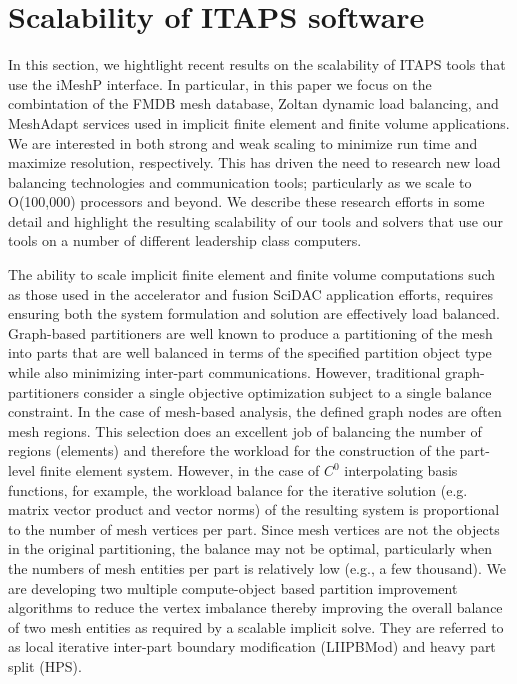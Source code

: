 \documentclass[letterpaper]{jpconf}
\begin{document}
\section{Scalability of ITAPS software}
\label{sec:petascale}

In this section, we hightlight recent results on the scalability of
ITAPS tools that use the iMeshP interface.  In particular, in this
paper we focus on the combintation of the FMDB mesh database, 
Zoltan dynamic load balancing, and MeshAdapt services used in implicit
finite element and finite volume applications.  We are interested in
both strong and weak scaling to minimize run time and maximize
resolution, respectively. This has driven the need to research new
load balancing technologies and communication tools; particularly as we
scale to O(100,000) processors and beyond.  We describe these research
efforts in some detail and highlight the resulting scalability of our
tools and solvers that use our tools on a number of different
leadership class computers.

The ability to scale implicit finite element and finite volume
computations such as those used in the accelerator and fusion SciDAC
application efforts, requires ensuring both the system formulation and
solution are effectively load balanced. Graph-based partitioners are
well known to produce a partitioning of the mesh into parts that are
well balanced in terms of the specified partition object type while
also minimizing inter-part communications. However, traditional
graph-partitioners consider a single objective optimization subject to
a single balance constraint. In the case of mesh-based analysis, the
defined graph nodes are often mesh regions. This selection does an
excellent job of balancing the number of regions (elements) and
therefore the workload for the construction of the part-level finite
element system. However, in the case of $C^0$ interpolating basis
functions, for example, the workload balance for the iterative
solution (e.g. matrix vector product and vector norms) of the
resulting system is proportional to the number of mesh vertices per
part. Since mesh vertices are not the objects in the original
partitioning, the balance may not be optimal, particularly when the
numbers of mesh entities per part is relatively low (e.g., a few
thousand). We are developing two multiple compute-object based
partition improvement algorithms to reduce the vertex imbalance
thereby improving the overall balance of two mesh entities as required
by a scalable implicit solve. They are referred to as local iterative
inter-part boundary modification (LIIPBMod) and heavy part split
(HPS).
\end{document}
